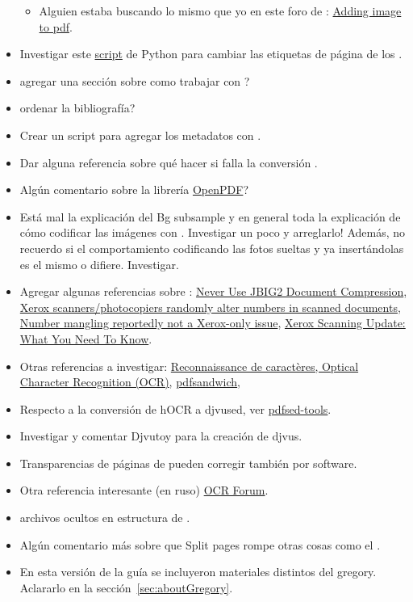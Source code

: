 \documentclass[%
	a5paper,
	10pt,
	twoside,
	openright,
	final,
]{memoir}
\begin{document}
\begin{itemize}
\begin{itemize}[noitemsep]
			\item Alguien estaba buscando lo mismo que yo en este foro de \imagemagick: \href{https://www.imagemagick.org/discourse-server/viewtopic.php?t=31103}{Adding image to pdf}.
		\end{itemize}
	\item Investigar este \href{https://github.com/lovasoa/pagelabels-py}{script} de Python para cambiar las etiquetas de página de los \pdf.
	\item agregar una sección sobre como trabajar con \djvulibre?
	\item ordenar la bibliografía?
	\item Crear un script para agregar los metadatos con \exiftool.
	\item Dar alguna referencia sobre qué hacer si falla la conversión \pdfa.
	\item Algún comentario sobre la librería \href{https://github.com/LibrePDF/OpenPDF/}{OpenPDF}?
	\item Está mal la explicación del Bg subsample y en general toda la explicación de cómo codificar las imágenes con \djvusmallmod. Investigar un poco y arreglarlo! Además, no recuerdo si el comportamiento codificando las fotos sueltas y ya insertándolas es el mismo o difiere. Investigar.
	\item Agregar algunas referencias sobre \jbig: \href{http://everist.org/NobLog/20131122_an_actual_knob.htm}{Never Use JBIG2 Document Compression}, \href{http://www.dkriesel.com/en/blog/2013/0802_xerox-workcentres_are_switching_written_numbers_when_scanning}{Xerox scanners/photocopiers randomly alter numbers in scanned documents}, \href{http://www.dkriesel.com/en/blog/2013/0808_number_mangling_not_a_xerox-only_issue}{Number mangling reportedly not a Xerox-only issue}, \href{https://www.xerox.com/assets/pdf/ScanningQAincludingAppendixA.pdf}{Xerox Scanning Update: What You Need To Know}.
	\item Otras referencias a investigar: \href{http://www.meeus-d.be/linux/OCR.html}{Reconnaissance de caractères, Optical Character Recognition (OCR)}, \href{http://www.tobias-elze.de/pdfsandwich/}{pdfsandwich}, 
	\item Respecto a la conversión de hOCR a djvused, ver \href{https://github.com/ksa242/pdfsed-tools}{pdfsed-tools}.
	\item Investigar y comentar Djvutoy para la creación de djvus.
	\item Transparencias de páginas de pueden corregir también por software.
	\item Otra referencia interesante (en ruso) \href{http://publ.lib.ru/cgi/forum/YaBB.pl?catselect=ocr}{OCR Forum}.
	\item archivos ocultos en estructura de \abby.
	\item Algún comentario más sobre que Split pages rompe otras cosas como el \djvuimager.
	\item En esta versión de la guía se incluyeron materiales distintos del gregory. Aclararlo en la sección~\ref{sec:aboutGregory}.
\end{itemize}
\end{document}
